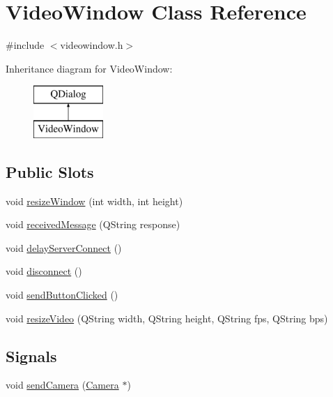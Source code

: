 \hypertarget{classVideoWindow}{\section{Video\-Window Class Reference}
\label{classVideoWindow}
}


{\ttfamily \#include $<$videowindow.\-h$>$}

Inheritance diagram for Video\-Window\-:\begin{figure}[H]
\begin{center}
\leavevmode
\includegraphics[height=2.000000cm]{classVideoWindow}
\end{center}
\end{figure}
\subsection*{Public Slots}
\begin{DoxyCompactItemize}
\item 
void \hyperlink{classVideoWindow_a5035f10be178cfc311d637c19938a344}{resize\-Window} (int width, int height)
\item 
void \hyperlink{classVideoWindow_ab25ad37e9dfdb92f46212d4309d4232f}{received\-Message} (Q\-String response)
\item 
void \hyperlink{classVideoWindow_a55220de4b6b3b8e2575201c933932059}{delay\-Server\-Connect} ()
\item 
void \hyperlink{classVideoWindow_a68b4f26c999360c30b12cc70347393c7}{disconnect} ()
\item 
void \hyperlink{classVideoWindow_a655194e6449c76e200135c88f8fafd7d}{send\-Button\-Clicked} ()
\item 
void \hyperlink{classVideoWindow_ac07f4db8a805849174cb129134708fd4}{resize\-Video} (Q\-String width, Q\-String height, Q\-String fps, Q\-String bps)
\end{DoxyCompactItemize}
\subsection*{Signals}
\begin{DoxyCompactItemize}
\item 
void \hyperlink{classVideoWindow_a726415adc7cbeb8ed1ac0892929ecfaf}{send\-Camera} (\hyperlink{classCamera}{Camera} $\ast$)
\end{DoxyCompactItemize}
